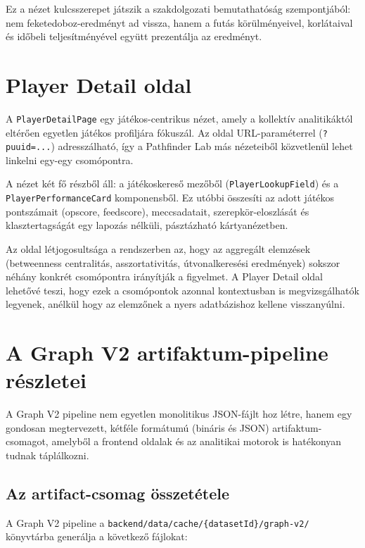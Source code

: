 ﻿\documentclass[a4paper,12pt]{report}
\begin{document}
Ez a nézet kulcsszerepet játszik a szakdolgozati bemutathatóság szempontjából: nem feketedoboz-eredményt ad vissza, hanem a futás körülményeivel, korlátaival és időbeli teljesítményével együtt prezentálja az eredményt.

\section{Player Detail oldal}

A \texttt{PlayerDetailPage} egy játékos-centrikus nézet, amely a kollektív analitikáktól eltérően egyetlen játékos profiljára fókuszál. Az oldal URL-paraméterrel (\texttt{?puuid=...}) adresszálható, így a Pathfinder Lab más nézeteiből közvetlenül lehet linkelni egy-egy csomópontra.

A nézet két fő részből áll: a játékoskereső mezőből (\texttt{PlayerLookupField}) és a \texttt{PlayerPerformanceCard} komponensből. Ez utóbbi összesíti az adott játékos pontszámait (opscore, feedscore), meccsadatait, szerepkör-eloszlását és klasztertagságát egy lapozás nélküli, pásztázható kártyanézetben.

Az oldal létjogosultsága a rendszerben az, hogy az aggregált elemzések (betweenness centralitás, asszortativitás, útvonalkeresési eredmények) sokszor néhány konkrét csomópontra irányítják a figyelmet. A Player Detail oldal lehetővé teszi, hogy ezek a csomópontok azonnal kontextusban is megvizsgálhatók legyenek, anélkül hogy az elemzőnek a nyers adatbázishoz kellene visszanyúlni.

\section{A Graph V2 artifaktum-pipeline részletei}
\label{sec:graph_v2_artifact}

A Graph V2 pipeline nem egyetlen monolitikus JSON-fájlt hoz létre, hanem egy gondosan megtervezett, kétféle formátumú (bináris és JSON) artifaktum-csomagot, amelyből a frontend oldalak és az analitikai motorok is hatékonyan tudnak táplálkozni.

\subsection{Az artifact-csomag összetétele}

A Graph V2 pipeline a \texttt{backend/data/cache/\{datasetId\}/graph-v2/} könyvtárba generálja a következő fájlokat:
\end{document}
